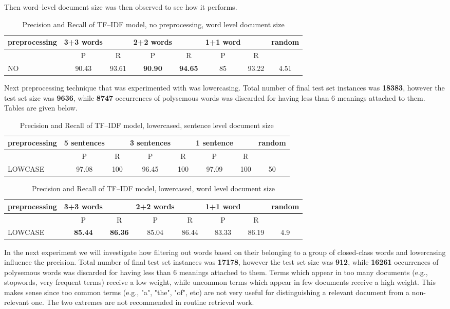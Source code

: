 Then word--level document size was then observed to see how it performs. 
\begin{table}[h!]
\begin{tabular}{ l | c c | c c | c c | c}
   preprocessing &  3+3 words && 2+2 words && 1+1 word  && random\\
\hline\hline
	& P  &  R & P  &  R & P  &  R &\\
\hline
NO & 90.43  & 93.61 & \textbf{90.90} & \textbf{94.65} & 85 & 93.22 & 4.51 \\
\end{tabular}
\caption{Precision and Recall of TF--IDF model, no preprocessing, word level document size}
\end{table}

Next preprocessing technique that was experimented with was lowercasing. Total number of final test set instances was \textbf{18383}, however the test set size was \textbf{9636}, while \textbf{8747} occurrences of polysemous words was discarded  for having less than 6 meanings attached to them. Tables are given below.
\begin{table}[h!]
\begin{tabular}{ l | c c | c c | c c | c}
   preprocessing &  5 sentences && 3 sentences && 1 sentence  && random\\
\hline
	& P  &  R & P  &  R & P  &  R &\\
\hline\hline
LOWCASE  & 97.08 & 100 & 96.45 & 100 & 97.09 & 100 & 50 \\
\end{tabular}
\caption{Precision and Recall of TF--IDF model, lowercased, sentence level document size}
\end{table}

\begin{table}[h!]
\begin{tabular}{ l | c c | c c | c c | c}
   preprocessing &  3+3 words && 2+2 words && 1+1 word  && random\\
\hline\hline
	& P  &  R & P  &  R & P  &  R &\\
\hline
LOWCASE  & \textbf{85.44}  &  \textbf{86.36} &  85.04 & 86.44 & 83.33  & 86.19  & 4.9 \\
\end{tabular}
\caption{Precision and Recall of TF--IDF model, lowercased, word level document size}
\end{table}

In the next experiment we 
will investigate how filtering out words based on their belonging to a group of closed-class words and 
lowercasing influence the precision. Total number of final test set instances was  \textbf{17178}, however the test set size was  \textbf{912}, while \textbf{16261} occurrences of polysemous words was discarded  for having less than 6 meanings attached to them. 
Terms which appear in too many documents (e.g., stopwords, very 
frequent terms) receive a low weight, while uncommon terms which appear in few documents receive a 
high weight. This makes sense since too common terms (e.g., "a", "the", "of", etc) are not very useful for 
distinguishing a relevant document from a non-relevant one. The two extremes are not recommended in routine retrieval work. 

